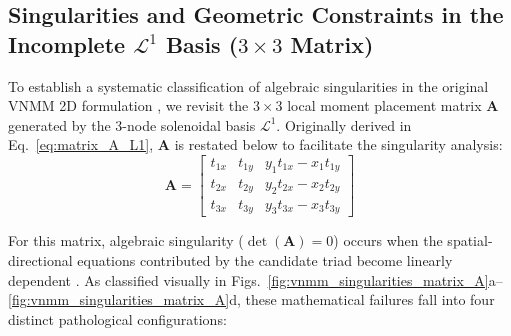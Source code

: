 \documentclass[preprint,12pt]{elsarticle}
\begin{document}
\subsection{Singularities and Geometric Constraints in the Incomplete \texorpdfstring{$\mathcal{L}^1$}{L1} Basis (\texorpdfstring{$3 \times 3$}{3x3} Matrix)}
\label{subsec:singularities_L1}

To establish a systematic classification of algebraic singularities in the original VNMM 2D formulation \cite{ortiz2021nodal, ortiz2023tese}, we revisit the $3 \times 3$ local moment placement matrix $\mathbf{A}$ generated by the 3-node solenoidal basis $\mathcal{L}^1$. Originally derived in Eq.~\eqref{eq:matrix_A_L1}, $\mathbf{A}$ is restated below to facilitate the singularity analysis:
\begin{equation}
\mathbf{A} = \begin{bmatrix}
t_{1x} & t_{1y} & y_1 t_{1x} - x_1 t_{1y} \\[4pt]
t_{2x} & t_{2y} & y_2 t_{2x} - x_2 t_{2y} \\[4pt]
t_{3x} & t_{3y} & y_3 t_{3x} - x_3 t_{3y}
\end{bmatrix}
\label{eq:matrix_A_L1_revisited}
\end{equation}

For this matrix, algebraic singularity ($\det(\mathbf{A}) = 0$) occurs when the spatial-directional equations contributed by the candidate triad become linearly dependent \cite{ortiz2023tese, goncalves2025tese}. As classified visually in Figs.~\ref{fig:vnmm_singularities_matrix_A}a--\ref{fig:vnmm_singularities_matrix_A}d, these mathematical failures fall into four distinct pathological configurations:
\end{document}
